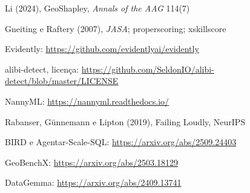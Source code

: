{\begin{enumerate}[label={[\arabic*]},leftmargin=2.2em,itemsep=1pt]
\item Li (2024), GeoShapley, \emph{Annals of the AAG} 114(7)
\item Gneiting e Raftery (2007), \emph{JASA}; properscoring; xskillscore
\item Evidently: \url{https://github.com/evidentlyai/evidently}
\item alibi-detect, licença: \url{https://github.com/SeldonIO/alibi-detect/blob/master/LICENSE}
\item NannyML: \url{https://nannyml.readthedocs.io/}
\item Rabanser, Günnemann e Lipton (2019), Failing Loudly, NeurIPS
\item BIRD e Agentar-Scale-SQL: \url{https://arxiv.org/abs/2509.24403}
\item GeoBenchX: \url{https://arxiv.org/abs/2503.18129}
\item DataGemma: \url{https://arxiv.org/abs/2409.13741}
\end{enumerate}}
